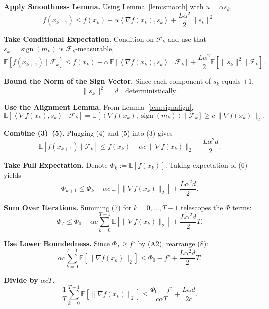 \documentclass{article}
\newcommand{\sign}{\operatorname{sign}}
\newcommand{\E}{\mathbb{E}}
\newcommand{\inner}[2]{\left\langle #1,#2\right\rangle}
\begin{document}
\begin{enumerate}[label={[\textbf{Step \arabic*}]}, leftmargin=*, itemsep=4pt]
\item \textbf{Apply Smoothness Lemma.}  
Using Lemma~\ref{lem:smooth} with $u=\alpha s_k$,
\[
f(x_{k+1})\le f(x_k)-\alpha\inner{\nabla f(x_k)}{s_k}+\frac{L\alpha^{2}}{2}\|s_k\|^{2}. \tag{2}
\]

\item \textbf{Take Conditional Expectation.}  
Condition on $\mathcal{F}_k$ and use that $s_k=\sign(m_k)$ is $\mathcal{F}_k$‑measurable,
\[
\E\!\left[f(x_{k+1})\mid\mathcal{F}_k\right]
\le f(x_k)-\alpha\,\E\!\left[\inner{\nabla f(x_k)}{s_k}\mid\mathcal{F}_k\right]
     +\frac{L\alpha^{2}}{2}\E\!\left[\|s_k\|^{2}\mid\mathcal{F}_k\right]. \tag{3}
\]

\item \textbf{Bound the Norm of the Sign Vector.}  
Since each component of $s_k$ equals $\pm1$,
\[
\|s_k\|^{2}=d \quad\text{deterministically}. \tag{4}
\]

\item \textbf{Use the Alignment Lemma.}  
From Lemma~\ref{lem:signalign},
\[
\E\!\left[\inner{\nabla f(x_k)}{s_k}\mid\mathcal{F}_k\right]
= \E\!\left[\inner{\nabla f(x_k)}{\sign(m_k)}\mid\mathcal{F}_k\right]
\ge c\,\|\nabla f(x_k)\|_{2}. \tag{5}
\]

\item \textbf{Combine (3)–(5).}  
Plugging (4) and (5) into (3) gives
\[
\E\!\left[f(x_{k+1})\mid\mathcal{F}_k\right]
\le f(x_k)-\alpha c\,\|\nabla f(x_k)\|_{2}
     +\frac{L\alpha^{2}d}{2}. \tag{6}
\]

\item \textbf{Take Full Expectation.}  
Denote $\Phi_k:=\E[f(x_k)]$. Taking expectation of (6) yields
\[
\Phi_{k+1}\le \Phi_k-\alpha c\,\E\!\left[\|\nabla f(x_k)\|_{2}\right]
               +\frac{L\alpha^{2}d}{2}. \tag{7}
\]

\item \textbf{Sum Over Iterations.}  
Summing (7) for $k=0,\dots,T-1$ telescopes the $\Phi$ terms:
\[
\Phi_T\le \Phi_0-\alpha c\sum_{k=0}^{T-1}\E\!\left[\|\nabla f(x_k)\|_{2}\right]
           +\frac{L\alpha^{2}d}{2}T. \tag{8}
\]

\item \textbf{Use Lower Boundedness.}  
Since $\Phi_T\ge f^\star$ by (A2), rearrange (8):
\[
\alpha c\sum_{k=0}^{T-1}\E\!\left[\|\nabla f(x_k)\|_{2}\right]
\le \Phi_0-f^\star+\frac{L\alpha^{2}d}{2}T. \tag{9}
\]

\item \textbf{Divide by $\alpha c T$.}  
\[
\frac{1}{T}\sum_{k=0}^{T-1}\E\!\left[\|\nabla f(x_k)\|_{2}\right]
\le \frac{\Phi_0-f^\star}{c\alpha T}
   +\frac{L\alpha d}{2c}. \tag{10}
\]


\end{enumerate}
\end{document}
